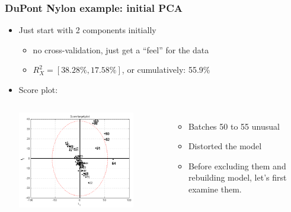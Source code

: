 \begin{frame}\frametitle{DuPont Nylon example: initial PCA}
	\begin{itemize}

		\item	Just start with 2 components initially
		
				\begin{itemize}					
					\item	no cross-validation, just get a ``feel'' for the data
					\item	\( R^2_X = [38.28\%, 17.58\%]\), or cumulatively: 55.9\%
				\end{itemize}
		
		\item	Score plot: {}
				
				\begin{columns}
						\begin{center}
							\includegraphics[width=0.8\textwidth]{images/dupont/dupont-raw-score-plot.png}
						\end{center}
						
						\begin{itemize}
							\item	Batches 50 to 55 unusual
							
							\item	Distorted the model		
							
							\item	Before excluding them and rebuilding model, let's first examine them.
						\end{itemize}
				\end{columns}
	\end{itemize}
\end{frame}

